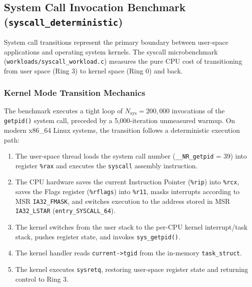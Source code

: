 \subsection{System Call Invocation Benchmark (\texttt{syscall\_deterministic})}
\label{subsec:syscall_methodology}

System call transitions represent the primary boundary between user-space applications and operating system kernels. The syscall microbenchmark (\texttt{workloads/syscall\_workload.c}) measures the pure CPU cost of transitioning from user space (Ring 3) to kernel space (Ring 0) and back.

\subsubsection{Kernel Mode Transition Mechanics}
The benchmark executes a tight loop of $N_{\text{sys}} = 200,000$ invocations of the \texttt{getpid()} system call, preceded by a 5,000-iteration unmeasured warmup. On modern x86\_64 Linux systems, the transition follows a deterministic execution path:
\begin{enumerate}
    \item The user-space thread loads the system call number (\texttt{\_\_NR\_getpid} = 39) into register \texttt{\%rax} and executes the \texttt{syscall} assembly instruction.
    \item The CPU hardware saves the current Instruction Pointer (\texttt{\%rip}) into \texttt{\%rcx}, saves the Flags register (\texttt{\%rflags}) into \texttt{\%r11}, masks interrupts according to MSR \texttt{IA32\_FMASK}, and switches execution to the address stored in MSR \texttt{IA32\_LSTAR} (\texttt{entry\_SYSCALL\_64}).
    \item The kernel switches from the user stack to the per-CPU kernel interrupt/task stack, pushes register state, and invokes \texttt{sys\_getpid()}.
    \item The kernel handler reads \texttt{current->tgid} from the in-memory \texttt{task\_struct}.
    \item The kernel executes \texttt{sysretq}, restoring user-space register state and returning control to Ring 3.
\end{enumerate}

